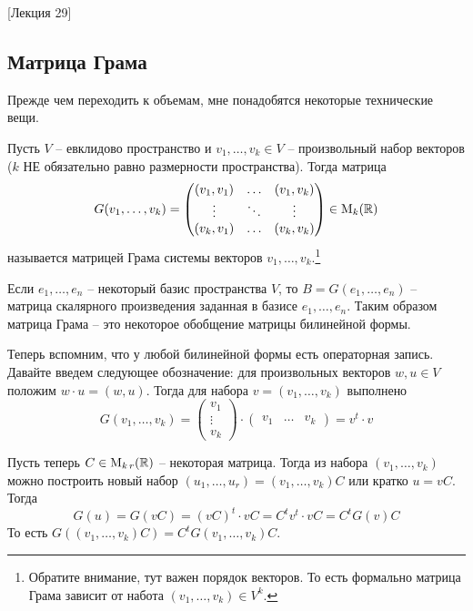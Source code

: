 [Лекция 29]


\subsection{Матрица Грама}\label{subsection::Gram}

Прежде чем переходить к объемам, мне понадобятся некоторые технические вещи.

\begin{definition}
Пусть $V$ -- евклидово пространство и $v_1,\ldots,v_k\in V$ -- произвольный набор векторов ($k$ НЕ обязательно равно размерности пространства). Тогда матрица
\[
G(v_1,\ldots,v_k) =
\begin{pmatrix}
{(v_1,v_1)}&{\ldots}&{(v_1,v_k)}\\
{\vdots}&{\ddots}&{\vdots}\\
{(v_k,v_1)}&{\ldots}&{(v_k,v_k)}\\
\end{pmatrix}
\in\operatorname{M}_{k}(\mathbb R)
\]
называется матрицей Грама системы векторов $v_1,\ldots,v_k$.\footnote{Обратите внимание, тут важен порядок векторов. То есть формально матрица Грама зависит от набота $(v_1,\ldots,v_k)\in V^k$.}
\end{definition}

Если $e_1,\ldots,e_n$ -- некоторый базис пространства $V$, то $B = G(e_1,\ldots,e_n)$ -- матрица скалярного произведения заданная в базисе $e_1,\ldots,e_n$. Таким образом матрица Грама -- это некоторое обобщение матрицы билинейной формы.

Теперь вспомним, что у любой билинейной формы есть операторная запись. Давайте введем следующее обозначение: для произвольных векторов $w, u\in V$ положим $w\cdot u = (w, u)$. Тогда для набора $v = (v_1,\ldots,v_k)$ выполнено
\[
G(v_1,\ldots,v_k) = 
\begin{pmatrix}
{v_1}\\{\vdots}\\{v_k}
\end{pmatrix}
\cdot
\begin{pmatrix}
{v_1}&{\ldots}&{v_k}
\end{pmatrix}
=
v^t \cdot v
\]

Пусть теперь $C\in \operatorname{M}_{k\,r}(\mathbb R)$ -- некоторая матрица. Тогда из набора $(v_1,\ldots,v_k)$ можно построить новый набор $(u_1,\ldots,u_r) = (v_1,\ldots,v_k)C$ или кратко $u = vC$. Тогда 
\[
G(u) = G(vC) = (vC)^t \cdot vC = C^t v^t \cdot v C = C^t G(v) C
\]
То есть $G((v_1,\ldots,v_k)C) = C^t G(v_1,\ldots,v_k)C$.


